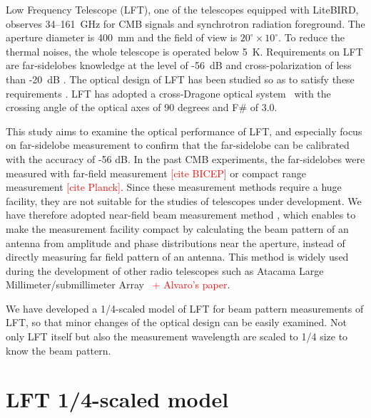 \documentclass[journal]{IEEEtran}
\newcommand{\red}[1]{\textcolor{red}{#1}}
\begin{document}
\par
Low Frequency Telescope (LFT), one of the telescopes equipped with LiteBIRD, observes 34--161~GHz for CMB signals and synchrotron radiation foreground. The aperture diameter is 400~mm and the field of view is $20^\circ \times 10^\circ$. To reduce the thermal noises, the whole telescope is operated below 5~K.
Requirements on LFT are far-sidelobes knowledge at the level of -56~dB
and cross-polarization of less than -20~dB \cite{Sekimoto2018}. The optical design of LFT has been studied so as to satisfy these requirements \cite{Kashima2018,Imada2018}.
LFT has adopted a cross-Dragone optical system~\cite{Dragone1978} with the crossing angle of the optical axes of 90 degrees and F\# of 3.0.
\par
This study aims to examine the optical performance of LFT, and especially focus on far-sidelobe measurement to confirm that the far-sidelobe can be calibrated with the accuracy of -56 dB. In the past CMB experiments, the far-sidelobes were measured with far-field measurement \red{[cite BICEP]} or compact range measurement \red{[cite Planck]}. Since these measurement methods require a huge facility, they are not suitable for the studies of telescopes under development. We have therefore adopted near-field beam measurement method \cite{Yaghjian1984}, which enables to make the measurement facility compact by calculating the beam pattern of an antenna from amplitude and phase distributions near the aperture, instead of directly measuring far field pattern of an antenna. This method is widely used during the development of other radio telescopes such as Atacama Large Millimeter/submillimeter Array~\cite{Naruse2009} \red{+ Alvaro's paper}. 
\par
We have developed a 1/4-scaled model of LFT for beam pattern measurements of LFT, so that minor changes of the optical design can be easily examined. Not only LFT itself but also the measurement wavelength are scaled to 1/4 size to know the beam pattern.
%
%
\section{LFT 1/4-scaled model}
%
\end{document}
